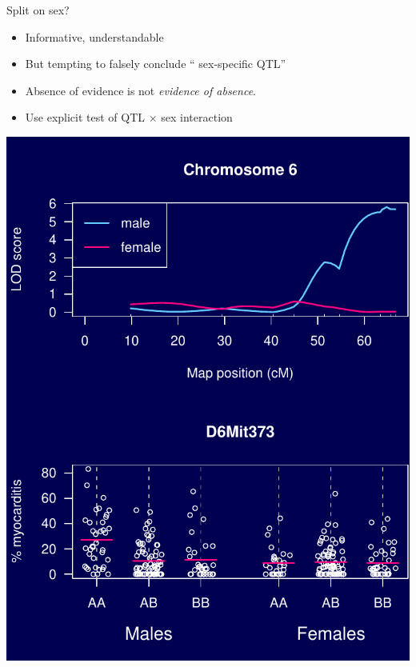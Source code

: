 \documentclass[12pt]{article}
\newcommand{\headsize}{\fontsize{35}{35} \selectfont}
\newcommand{\smallsize}{\fontsize{25}{30} \selectfont}
\newcommand{\smallersize}{\fontsize{20}{25} \selectfont}
\begin{document}
\newpage

\headsize \color{myyellow}
\hfill \begin{minipage}{5.75in}
\centering
Split on sex?
\end{minipage}

\vspace{15mm}

\color{mywhite} \smallsize

\hspace*{0.5in}
\begin{minipage}[t]{4.1in}
\vspace*{25mm}

\sloppy
\smallersize
\begin{itemize}
\setlength{\rightskip}{0pt plus 1fil} %
\item Informative, understandable
\item But tempting to falsely conclude
  ``{\color{mypink} sex-specific QTL}''
\item Absence of evidence {\color{mypink} is not}
  \emph{evidence of absence}.
\item Use explicit test of QTL $\times$ sex interaction
\end{itemize}
\end{minipage}
\hfill
\begin{minipage}[t]{5.3in}
\vspace*{0mm}

\includegraphics{FigsA/covar.pdf}
\end{minipage}
\end{document}
